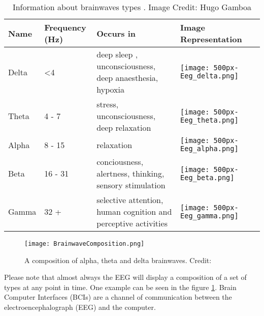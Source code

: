 \begin{table}[h]
                             
\begin{tabular}{ | C | C | C | m{8cm}C | }
\hline
\textbf{Name}  & \textbf{Frequency (Hz)} & \textbf{Occurs in} & \textbf{Image Representation} \\ \hline
Delta & \textless 4    & deep sleep , unconsciousness, deep anaesthesia, hypoxia          & \texttt{[image: 500px-Eeg\_delta.png]}        \\ \hline
Theta & 4 - 7          & stress, unconsciousness, deep relaxation          & \texttt{[image: 500px-Eeg\_theta.png]}        \\ \hline
Alpha & 8 - 15         & relaxation          & \texttt{[image: 500px-Eeg\_alpha.png]}        \\ \hline
Beta  & 16 - 31        & conciousness, alertness, thinking, sensory stimulation          & \texttt{[image: 500px-Eeg\_beta.png]}         \\ \hline
Gamma & 32 +           & selective attention, human cognition and perceptive activities         & \texttt{[image: 500px-Eeg\_gamma.png]}        \\ \hline
\end{tabular}
\caption {Information about brainwaves types \cite{musicEEG}. Image Credit: Hugo Gamboa}
\label{table:brainwaves}
\end{table}

\begin{figure}
  \centering
  \texttt{[image: BrainwaveComposition.png]}
  \caption{A composition of alpha, theta and delta brainwaves. Credit: \cite{gall1992method}
    \label{fig:brainwaveComposition}}           
\end{figure}

Please note that almost always the EEG will display a composition of a set of types at any point in time. One example can be seen in the figure \ref{fig:brainwaveComposition}. Brain Computer Interfaces (BCIs) are a channel of communication between the electroencephalograph (EEG) and the computer.

